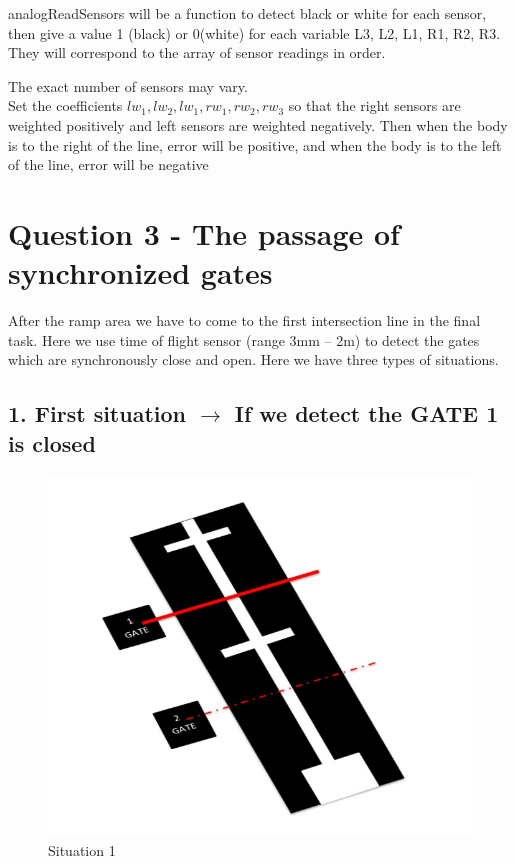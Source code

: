 \documentclass[a4paper, 12pt]{article}
\begin{document}
        analogReadSensors will be a function to detect black or white for each sensor, then give a value 1 (black) or 0(white) for each variable L3, L2, L1, R1, R2, R3. They will correspond to the array of sensor readings in order. \par
        The exact number of sensors may vary.\\
        Set the coefficients $lw_1, lw_2,lw_1, rw_1, rw_2,rw_3$ so that the right sensors are weighted positively and left sensors are weighted negatively. Then when the body is to the right of the line, error will be positive, and when the body is to the left of the line, error will be negative


\newpage
\section*{Question 3 - The passage of synchronized gates }
    After the ramp area we have to come to the first intersection line in the final task.
    Here we use time of flight sensor (range 3mm – 2m) to detect the gates which are synchronously close and open. Here we have three types of situations.\\
    
    \subsection*{1.	First situation $\rightarrow$ If we detect the GATE 1 is closed}
        \begin{figure}[h]
            \centering
            \includegraphics[scale = 0.5]{images/sit1.jpg}
            \caption{Situation 1}
            \label{fig:my_label}
        \end{figure}
        
\end{document}
